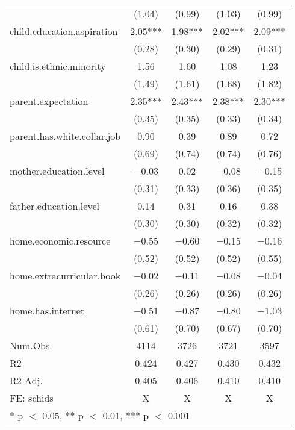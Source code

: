 \documentclass[
  man,floatsintext]{apa7}
\begin{document}
\begin{table}
\begin{tabular}[t]{lcccc}
 & (\num{1.04}) & (\num{0.99}) & (\num{1.03}) & (\num{0.99})\\
child.education.aspiration & \num{2.05}*** & \num{1.98}*** & \num{2.02}*** & \num{2.09}***\\
 & (\num{0.28}) & (\num{0.30}) & (\num{0.29}) & (\num{0.31})\\
child.is.ethnic.minority & \num{1.56} & \num{1.60} & \num{1.08} & \num{1.23}\\
 & (\num{1.49}) & (\num{1.61}) & (\num{1.68}) & (\num{1.82})\\
parent.expectation & \num{2.35}*** & \num{2.43}*** & \num{2.38}*** & \num{2.30}***\\
 & (\num{0.35}) & (\num{0.35}) & (\num{0.33}) & (\num{0.34})\\
parent.has.white.collar.job & \num{0.90} & \num{0.39} & \num{0.89} & \num{0.72}\\
 & (\num{0.69}) & (\num{0.74}) & (\num{0.74}) & (\num{0.76})\\
mother.education.level & \num{-0.03} & \num{0.02} & \num{-0.08} & \num{-0.15}\\
 & (\num{0.31}) & (\num{0.33}) & (\num{0.36}) & (\num{0.35})\\
father.education.level & \num{0.14} & \num{0.31} & \num{0.16} & \num{0.38}\\
 & (\num{0.30}) & (\num{0.30}) & (\num{0.32}) & (\num{0.32})\\
home.economic.resource & \num{-0.55} & \num{-0.60} & \num{-0.15} & \num{-0.16}\\
 & (\num{0.52}) & (\num{0.52}) & (\num{0.52}) & (\num{0.55})\\
home.extracurricular.book & \num{-0.02} & \num{-0.11} & \num{-0.08} & \num{-0.04}\\
 & (\num{0.26}) & (\num{0.26}) & (\num{0.26}) & (\num{0.26})\\
home.has.internet & \num{-0.51} & \num{-0.87} & \num{-0.80} & \num{-1.03}\\
 & (\num{0.61}) & (\num{0.70}) & (\num{0.67}) & (\num{0.70})\\
\midrule
Num.Obs. & \num{4114} & \num{3726} & \num{3721} & \num{3597}\\
R2 & \num{0.424} & \num{0.427} & \num{0.430} & \num{0.432}\\
R2 Adj. & \num{0.405} & \num{0.406} & \num{0.410} & \num{0.410}\\
FE: schids & X & X & X & X\\
\bottomrule
\multicolumn{5}{l}{\rule{0pt}{1em}* p $<$ 0.05, ** p $<$ 0.01, *** p $<$ 0.001}\\
\end{tabular}
\end{table}
\end{document}
